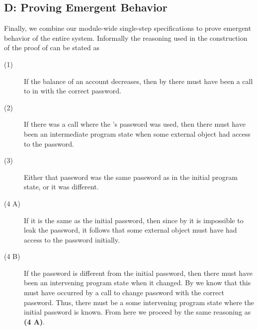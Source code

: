 \subsection{D: Proving Emergent Behavior}
Finally, we combine our module-wide single-step \Nec specifications to 
prove emergent behavior of the entire system. Informally the
reasoning used in the construction of the proof of  can be stated as
\begin{description}
\item [(1)]
If the balance of an account decreases, then
by  there must have been a call
to  in  with the correct password.
\item [(2)]
If there was a call where the 's password 
was used, then there must have been an intermediate program state
when some external object had access to the password.
\item [(3)]
Either that password was the same password as in the initial 
program state, or it was different.
\item [(4 A)]
If it is the same as the initial password, then since by 
it is impossible to leak the password, it follows that some external object 
must have had access to the password initially.
\item [(4 B)]
If the password is different from the initial password, 
then there must have been an intervening program state when it 
changed. By  we know that this must have occurred
by a call to change password with the correct password. Thus,
there must be a some intervening program state where the initial
password is known. From here we proceed by the same reasoning 
as \textbf{(4 A)}.
\end{description}
